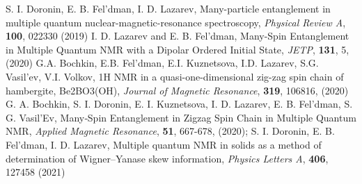  S. I. Doronin, E. B. Fel'dman,  I. D. Lazarev, Many-particle entanglement in multiple quantum nuclear-magnetic-resonance spectroscopy, \textit{Physical Review A}, \textbf{100}, 022330 (2019)
 I. D. Lazarev and E. B. Fel'dman, Many-Spin Entanglement in Multiple Quantum NMR with a Dipolar Ordered Initial State,  \textit{JETP}, \textbf{131}, 5, (2020)
 G.A. Bochkin, E.B. Fel'dman, E.I. Kuznetsova, I.D. Lazarev, S.G. Vasil'ev, V.I. Volkov, 1H NMR in a quasi-one-dimensional zig-zag spin chain of hambergite, Be2BO3(OH), \textit{Journal of Magnetic Resonance}, \textbf{319}, 106816, (2020)
 G. A. Bochkin, S. I. Doronin, E. I. Kuznetsova, I. D. Lazarev, E. B. Fel’dman, S. G. Vasil’Ev, Many‐Spin Entanglement in Zigzag Spin Chain in Multiple Quantum NMR, \textit{Applied Magnetic Resonance}, \textbf{51}, 667-678, (2020);
 S. I. Doronin, E. B. Fel'dman,  I. D. Lazarev, Multiple quantum NMR in solids as a method of determination of Wigner–Yanase skew information, \textit{Physics Letters A}, \textbf{406}, 127458 (2021)